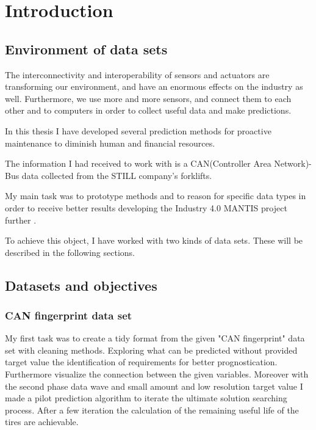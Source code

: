 \chapter{Introduction}
\section{Environment of data sets}
The interconnectivity and interoperability \cite{TalebArchInsSys} of sensors and actuators are transforming our environment, and have an enormous effects on the industry as well. Furthermore, we use more and more sensors, and connect them to each other and to computers in order to collect useful data and make predictions.

In this thesis I have developed several prediction methods for proactive maintenance to diminish human and financial resources.

The information I had received to work with is a CAN(Controller Area Network)-Bus data collected from the STILL company's forklifts.

My main task was to prototype methods and to reason for specific data types in order to receive better results developing the Industry 4.0 \cite{Indfourpointzero} MANTIS project further \cite{PaliHCsCPS,HCsCPS2,GartnerIoT,HuangCPS,PaliCPS,HCsCPS,ProMain}.

To achieve this object, I have worked with two kinds of data sets. These will be described in the following sections.
\section{Datasets and objectives}
    \subsection{CAN fingerprint data set}
\noindent
My first task was to create a tidy format from the given "CAN fingerprint" data set with cleaning methods. Exploring what can be predicted without provided target value  the identification of requirements for better prognostication. Furthermore visualize the connection between the given variables. Moreover with the second phase data wave and small amount and low resolution target value I made a pilot prediction algorithm to iterate the ultimate solution searching process. 
\noindent
After a few iteration the calculation of the remaining useful life of the tires are achievable. 
